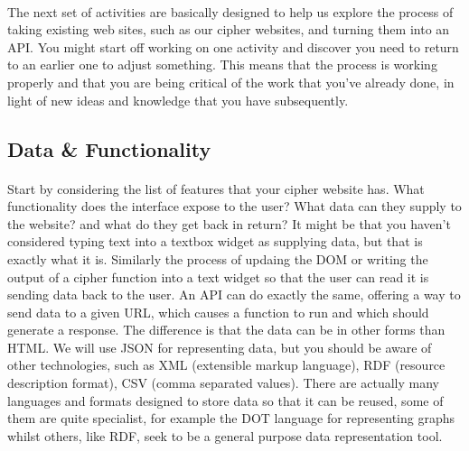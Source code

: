 \documentclass[10pt, a4paper, twosize]{article}
\begin{document}
\paragraph{} The next set of activities are basically designed to help us explore the process of taking existing web sites, such as our cipher websites, and turning them into an API. You might start off working on one activity and discover you need to return to an earlier one to adjust something. This means that the process is working properly and that you are being critical of the work that you've already done, in light of new ideas and knowledge that you have subsequently.

\subsection{Data \& Functionality}
\paragraph{} Start by considering the list of features that your cipher website has. What functionality does the interface expose to the user? What data can they supply to the website? and what do they get back in return? It might be that you haven't considered typing text into a textbox widget as supplying data, but that is exactly what it is. Similarly the process of updaing the DOM or writing the output of a cipher function into a text widget so that the user can read it is sending data back to the user. An API can do exactly the same, offering a way to send data to a given URL, which causes a function to run and which should generate a response. The difference is that the data can be in other forms than HTML. We will use JSON for representing data, but you should be aware of other technologies, such as XML (extensible markup language), RDF (resource description format), CSV (comma separated values). There are actually many languages and formats designed to store data so that it can be reused, some of them are quite specialist, for example the DOT language for representing graphs whilst others, like RDF, seek to be a general purpose data representation tool.
\end{document}
